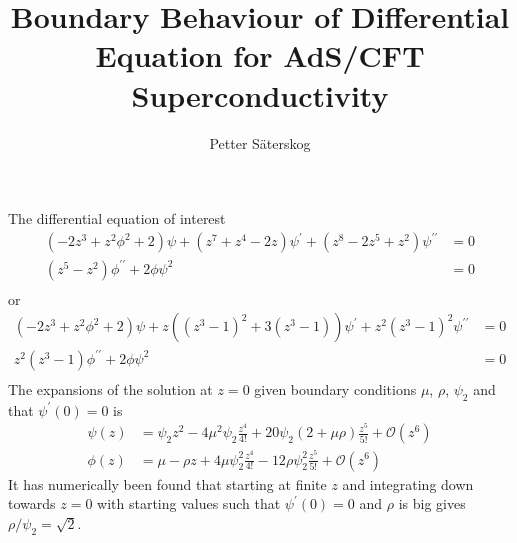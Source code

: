 \documentclass[12pt]{article}
\title{Boundary Behaviour of Differential Equation for AdS/CFT Superconductivity}
\author{Petter Säterskog}
\begin{document}
\maketitle
The differential equation of interest
\begin{equation}
 \begin{split}
  (-2z^3+z^2\phi^2+2)\psi+(z^7+z^4-2z)\psi^\prime+(z^8-2z^5+z^2)\psi^{\prime\prime}&=0\\
  (z^5-z^2)\phi^{\prime\prime}+2\phi\psi^2&=0\\
 \end{split}
\end{equation}
or
\begin{equation}
 \begin{split}
  (-2z^3+z^2\phi^2+2)\psi+z\left((z^3-1)^2+3(z^3-1)\right)\psi^\prime+z^2(z^3-1)^2\psi^{\prime\prime}&=0\\
  z^2(z^3-1)\phi^{\prime\prime}+2\phi\psi^2&=0\\
 \end{split}
\end{equation}
The expansions of the solution at $z=0$ given boundary conditions $\mu$, $\rho$, $\psi_2$ and that $\psi^\prime(0)=0$ is
\begin{equation}
 \begin{split}
  \psi(z)&=\psi_2z^2-4\mu^2\psi_2\frac{z^4}{4!}+20\psi_2(2+\mu\rho)\frac{z^5}{5!}+ \mathcal{O}(z^6)\\
\phi(z)&=\mu-\rho z+4\mu\psi_2^2\frac{z^4}{4!}-12\rho\psi_2^2\frac{z^5}{5!} +\mathcal{O}(z^6)
 \end{split}
\end{equation}
It has numerically been found that starting at finite $z$ and integrating down towards $z=0$ with starting values such that $\psi^\prime(0)=0$ and $\rho$ is big gives $\rho/\psi_2=\sqrt{2}$.
\end{document}
